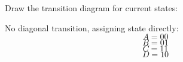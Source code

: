 \documentclass[12pt, a4paper]{article}
\begin{document}
	Draw the transition diagram for current states:
	\begin{center}
	\end{center}
	
	No diagonal transition, assigning state directly:
	$$A=00$$
	$$B=01$$
	$$C=11$$
	$$D=10$$
	
\end{document}
